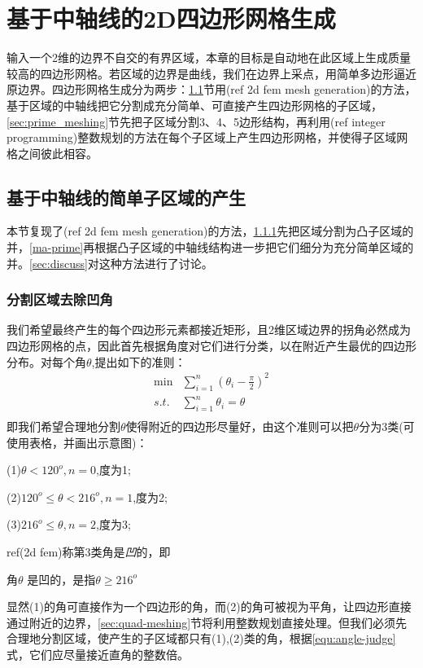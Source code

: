 \chapter{基于中轴线的2D四边形网格生成}
输入一个2维的边界不自交的有界区域，本章的目标是自动地在此区域上生成质量较高的四边形网格。若区域的边界是曲线，我们在边界上采点，用简单多边形逼近原边界。四边形网格生成分为两步：\ref{sec:ma_subdivion}节用(ref 2d fem mesh generation)的方法，基于区域的中轴线把它分割成充分简单、可直接产生四边形网格的子区域，\ref{sec:prime_meshing}节先把子区域分割3、4、5边形结构，再利用(ref integer programming)整数规划的方法在每个子区域上产生四边形网格，并使得子区域网格之间彼此相容。

\section{基于中轴线的简单子区域的产生}\label{sec:ma_subdivion}
本节复现了(ref 2d fem mesh generation)的方法，\ref{sec:cocavity-removal}先把区域分割为凸子区域的并，\ref{ma-prime}再根据凸子区域的中轴线结构进一步把它们细分为充分简单区域的并。\ref{sec:discuss}对这种方法进行了讨论。
\subsection{分割区域去除凹角}\label{sec:cocavity-removal}
我们希望最终产生的每个四边形元素都接近矩形，且2维区域边界的拐角必然成为四边形网格的点，因此首先根据角度对它们进行分类，以在附近产生最优的四边形分布。对每个角$\theta$,提出如下的准则：
\begin{equation} \label{equ:angle-judge}
\begin{split}
\min  &{\sum_{i=1}^n(\theta_i-\frac{\pi}{2})^2}\\
s.t.\,  &\sum_{i=1}^{n}\theta_i=\theta\\
\end{split}
\end{equation}
即我们希望合理地分割$\theta$使得附近的四边形尽量好，由这个准则可以把$\theta$分为3类(可使用表格，并画出示意图)：
	
(1)$\theta < 120^o,n=0$,度为1;

(2)$120^o \leq \theta < 216^o,n=1$,度为2;

(3)$216^o \leq \theta,n=2$,度为3;

ref(2d fem)称第3类角是\emph{凹}的，即
\begin{definition}\label{def:concave}
	角$\theta$ 是凹的，是指$\theta \geq 216^o$
\end{definition}
显然(1)的角可直接作为一个四边形的角，而(2)的角可被视为平角，让四边形直接通过附近的边界，\ref{sec:quad-meshing}节将利用整数规划直接处理。但我们必须先合理地分割区域，使产生的子区域都只有(1),(2)类的角，根据\ref{equ:angle-judge}式，它们应尽量接近直角的整数倍。

